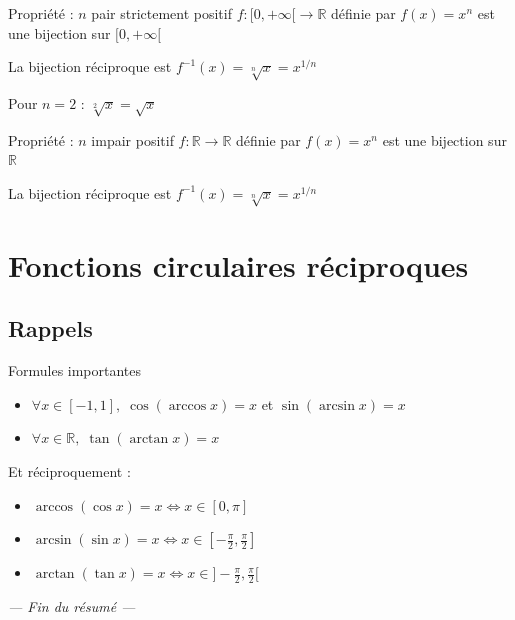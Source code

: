 \documentclass[a4paper,11pt]{article}
\begin{document}
\begin{propbox}{Propriété : $n$ pair strictement positif}
$f : [0, +\infty[ \to \mathbb{R}$ définie par $f(x) = x^n$ est une bijection sur $[0, +\infty[$

La bijection réciproque est $f^{-1}(x) = \sqrt[n]{x} = x^{1/n}$

Pour $n = 2$ : $\sqrt[2]{x} = \sqrt{x}$
\end{propbox}

\begin{propbox}{Propriété : $n$ impair positif}
$f : \mathbb{R} \to \mathbb{R}$ définie par $f(x) = x^n$ est une bijection sur $\mathbb{R}$

La bijection réciproque est $f^{-1}(x) = \sqrt[n]{x} = x^{1/n}$
\end{propbox}

\newpage
\section{Fonctions circulaires réciproques}

\subsection{Rappels}

\begin{propbox}{Formules importantes}
\begin{itemize}
    \item $\forall x \in [-1, 1], \; \cos(\arccos x) = x$ et $\sin(\arcsin x) = x$
    \item $\forall x \in \mathbb{R}, \; \tan(\arctan x) = x$
\end{itemize}

Et réciproquement :
\begin{itemize}
    \item $\arccos(\cos x) = x \Leftrightarrow x \in [0, \pi]$
    \item $\arcsin(\sin x) = x \Leftrightarrow x \in [-\frac{\pi}{2}, \frac{\pi}{2}]$
    \item $\arctan(\tan x) = x \Leftrightarrow x \in ]-\frac{\pi}{2}, \frac{\pi}{2}[$
\end{itemize}
\end{propbox}

\vspace{1cm}
\begin{center}
\textit{--- Fin du résumé ---}
\end{center}
\end{document}
